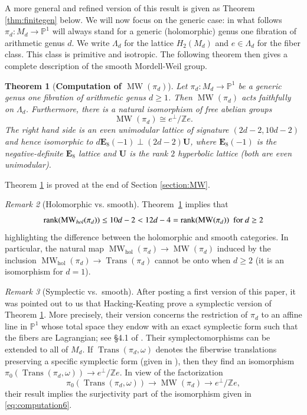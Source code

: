 \documentclass[10pt,letterpaper]{amsart}
\numberwithin{equation}{section}
\def\PP{{\mathbb P}}
\def\Pb{{\mathbb P}}
\def\ZZ{{\mathbb Z}}
\def\Zb{{\mathbb Z}}
\def\Eb{\mathbf {E}}
\def\Ub{\mathbf{U}}
\def\hol{\mathrm{hol}}
\newcommand\MW{\operatorname{MW}}
\newcommand\Trans{\operatorname{Trans}}
\newcommand\rank{\operatorname{rank}}
\newtheorem{theorem}{Theorem}[section]
\theoremstyle{remark}
\newtheorem{remark}[theorem]{Remark}
\begin{document}
A more general and refined version of this result is 
given as Theorem \ref{thm:finitegen} below.  We will now focus 
on the generic case:  in what follows $\pi_d:M_d\to\Pb^1$ will always stand for a generic (holomorphic) genus one fibration of arithmetic genus $d$. We write $\Lambda_d$ for the lattice $H_2(M_d)$ and $e\in \Lambda_d$ for the fiber class. This class is primitive and isotropic. The following theorem then gives a complete description of the smooth Mordell-Weil group. 

\begin{theorem}[{\bf Computation of \boldmath$\MW(\pi_d)$}]
\label{theorem:computeMW}
Let $\pi_d:M_d\to\Pb^1$ be a generic genus one fibration of arithmetic genus $d\geq 1$. Then 
$\MW(\pi_d)$ acts faithfully on $\Lambda_d$.  Furthermore,  there is 
a natural  isomorphism of free abelian groups
\begin{equation}
\label{eq:computation6}
 \MW(\pi_d)\cong e^\perp/\ZZ e. 
 \end{equation}
The right hand side is an even {unimodular} lattice of signature $(2d-2, 10d-2)$ and hence isomorphic to $d\Eb_8(-1)\perp(2d-2)\Ub$, where $\Eb_8(-1)$ is the negative-definite $\Eb_8$ lattice  and $\Ub$ is the rank $2$ 
hyperbolic lattice (both are even unimodular).
\end{theorem}
Theorem \ref{theorem:computeMW} is proved at the end of Section \ref{section:MW}.

\begin{remark}[Holomorphic vs. smooth]
\label{remark:comparison1}
Theorem~\ref{theorem:computeMW} implies that
\[
\rank (\MW_{\rm hol}(\pi_d))\leq 10d-2 < 12d-4=\rank (\MW(\pi_d)) \ \ \text{for $d\geq 2$}
\]
highlighting the difference between the holomorphic and smooth 
categories.   In particular, the natural map $\MW_\hol(\pi_d)\to\MW(\pi_d)$ 
induced by the inclusion  $\MW_\hol(\pi_d)\to\Trans(\pi_d)$ cannot be onto when $d\ge 2$ (it  is an isomorphism for $d=1$).
\end{remark}

\begin{remark}[Symplectic vs.\ smooth]
After posting a first version of this paper, it was pointed out to us that Hacking-Keating prove a symplectic version of Theorem \ref{theorem:computeMW}.  
More precisely, their version concerns the restriction of $\pi_d$ to an affine line in $\PP^1$ whose total space  they endow with  an  exact symplectic form such that the fibers are Lagrangian; see \S 4.1 of \cite{HK}. Their symplectomorphisms can be extended to all of $M_d$.  If $\Trans(\pi_d,\omega)$ denotes the fiberwise translations preserving a  specific symplectic form (given in \cite{HK}),  then they find an isomorphism $\pi_0(\Trans(\pi_d,\omega))\to e^\perp/\Zb e$.  In view of  the factorization
\[\pi_0(\Trans(\pi_d,\omega))\to\MW(\pi_d)\to e^\perp/\Zb e,\]
their result implies the surjectivity part of the isomorphism given in \eqref{eq:computation6}.
\end{remark}
\end{document}
